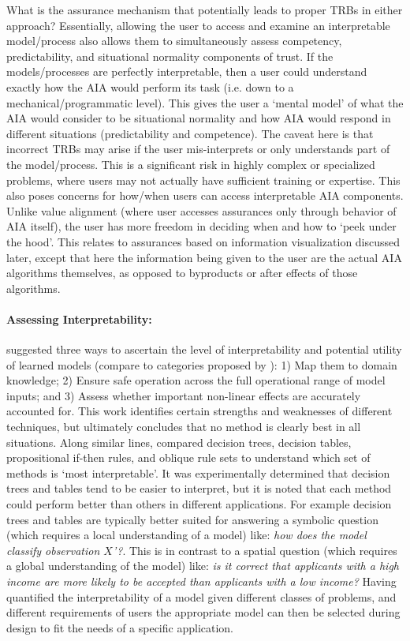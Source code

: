 What is the assurance mechanism that potentially leads to proper TRBs in either approach? 
Essentially, allowing the user to access and examine an interpretable model/process also allows them to simultaneously assess competency, predictability, and situational normality components of trust. If the models/processes are perfectly interpretable, then a user could understand exactly how the AIA would perform its task (i.e. down to a mechanical/programmatic level). 
This gives the user a `mental model' of what the AIA would consider to be situational normality and how AIA would respond in different situations (predictability and competence). 
The caveat here is that incorrect TRBs may arise if the user mis-interprets or only understands part of the model/process. 
This is a significant risk in highly complex or specialized problems, where users may not actually have sufficient training or expertise. This also poses concerns for how/when users can access interpretable AIA components. 
Unlike value alignment (where user accesses assurances only through behavior of AIA itself), the user has more freedom in deciding when and how to `peek under the hood'. This relates to assurances based on information visualization discussed later, except that here the information being given to the user are the actual AIA algorithms themselves, as opposed to byproducts or after effects of those algorithms.

\paragraph{Assessing Interpretability:}
\citet{Van_Belle2013-ph} suggested three ways to ascertain the level of interpretability and potential utility of learned models (compare to categories proposed by \citet{Lipton2016-ug}): 1) Map them to domain knowledge; 2) Ensure safe operation across the full operational range of model inputs; and 3) Assess whether important non-linear effects are accurately accounted for. This work identifies certain strengths and weaknesses of different techniques, but ultimately concludes that no method is clearly best in all situations. 
Along similar lines, \citet{Huysmans2011-th} compared decision trees, decision tables, propositional if-then rules, and oblique rule sets to understand which set of methods is `most interpretable'. It was experimentally determined that decision trees and tables tend to be easier to interpret, but it is noted that each method could perform better than others in different applications. For example decision trees and tables are typically better suited for answering a symbolic question (which requires a local understanding of a model) like: \emph{how does the model classify observation $X$'?}. This is in contrast to a spatial question (which requires a global understanding of the model) like: \emph{is it correct that applicants with a high income are more likely to be accepted than applicants with a low income?}
Having quantified the interpretability of a model given different classes of problems, and different requirements of users the appropriate model can then be selected during design to fit the needs of a specific application.

